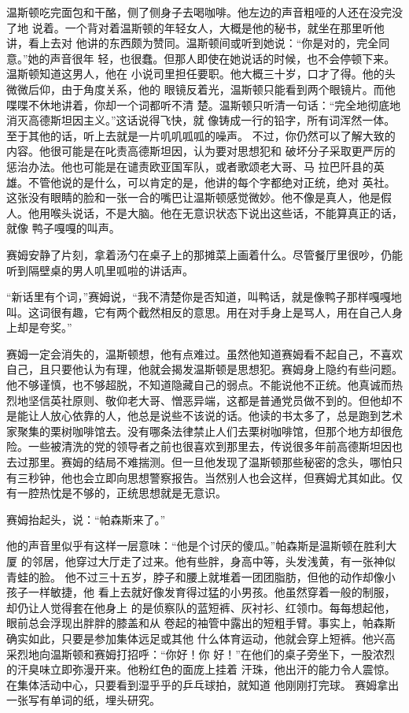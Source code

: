 温斯顿吃完面包和干酪，侧了侧身子去喝咖啡。他左边的声音粗哑的人还在没完没了地
说着。一个背对着温斯顿的年轻女人，大概是他的秘书，就坐在那里听他讲，看上去对
他讲的东西颇为赞同。温斯顿间或听到她说：``你是对的，完全同意。''她的声音很年
轻，也很蠢。但那人即使在她说话的时候，也不会停顿下来。温斯顿知道这男人，他在
小说司里担任要职。他大概三十岁，口才了得。他的头微微后仰，由于角度关系，他的
眼镜反着光，温斯顿只能看到两个眼镜片。而他喋喋不休地讲着，你却一个词都听不清
楚。温斯顿只听清一句话：``完全地彻底地消灭高德斯坦因主义。''这话说得飞快，就
像铸成一行的铅字，所有词浑然一体。至于其他的话，听上去就是一片叽叽呱呱的噪声。
不过，你仍然可以了解大致的内容。他很可能是在叱责高德斯坦因，认为要对思想犯和
破坏分子采取更严厉的惩治办法。他也可能是在谴责欧亚国军队，或者歌颂老大哥、马
拉巴阡县的英雄。不管他说的是什么，可以肯定的是，他讲的每个字都绝对正统，绝对
英社。这张没有眼睛的脸和一张一合的嘴巴让温斯顿感觉微妙。他不像是真人，他是假
人。他用喉头说话，不是大脑。他在无意识状态下说出这些话，不能算真正的话，就像
鸭子嘎嘎的叫声。

赛姆安静了片刻，拿着汤勺在桌子上的那摊菜上画着什么。尽管餐厅里很吵，仍能听到隔壁桌的男人叽里呱啦的讲话声。

``新话里有个词，''赛姆说，``我不清楚你是否知道，叫鸭话，就是像鸭子那样嘎嘎地叫。这词很有趣，它有两个截然相反的意思。用在对手身上是骂人，用在自己人身上却是夸奖。''

赛姆一定会消失的，温斯顿想，他有点难过。虽然他知道赛姆看不起自己，不喜欢自己，且只要他认为有理，他就会揭发温斯顿是思想犯。赛姆身上隐约有些问题。他不够谨慎，也不够超脱，不知道隐藏自己的弱点。不能说他不正统。他真诚而热烈地坚信英社原则、敬仰老大哥、憎恶异端，这都是普通党员做不到的。但他却不是能让人放心依靠的人，他总是说些不该说的话。他读的书太多了，总是跑到艺术家聚集的栗树咖啡馆去。没有哪条法律禁止人们去栗树咖啡馆，但那个地方却很危险。一些被清洗的党的领导者之前也很喜欢到那里去，传说很多年前高德斯坦因也去过那里。赛姆的结局不难揣测。但一旦他发现了温斯顿那些秘密的念头，哪怕只有三秒钟，他也会立即向思想警察报告。当然别人也会这样，但赛姆尤其如此。仅有一腔热忱是不够的，正统思想就是无意识。

赛姆抬起头，说：``帕森斯来了。''

他的声音里似乎有这样一层意味：``他是个讨厌的傻瓜。''帕森斯是温斯顿在胜利大厦
的邻居，他穿过大厅走了过来。他有些胖，身高中等，头发浅黄，有一张神似青蛙的脸。
他不过三十五岁，脖子和腰上就堆着一团团脂肪，但他的动作却像小孩子一样敏捷，他
看上去就好像发育得过猛的小男孩。他虽然穿着一般的制服，却仍让人觉得套在他身上
的是侦察队的蓝短裤、灰衬衫、红领巾。每每想起他，眼前总会浮现出胖胖的膝盖和从
卷起的袖管中露出的短粗手臂。事实上，帕森斯确实如此，只要是参加集体远足或其他
什么体育运动，他就会穿上短裤。他兴高采烈地向温斯顿和赛姆打招呼：``你好！你
好！''在他们的桌子旁坐下，一股浓烈的汗臭味立即弥漫开来。他粉红色的面庞上挂着
汗珠，他出汗的能力令人震惊。在集体活动中心，只要看到湿乎乎的乒乓球拍，就知道
他刚刚打完球。 赛姆拿出一张写有单词的纸，埋头研究。

